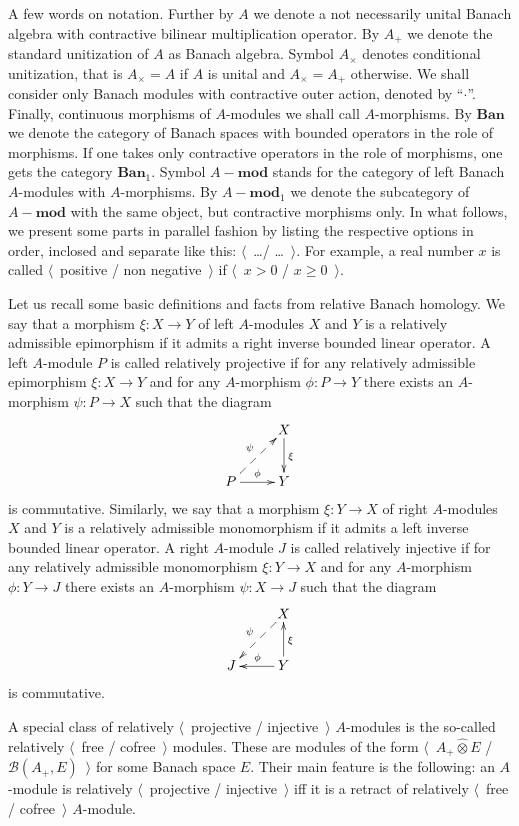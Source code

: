 \documentclass[12pt]{article}
\newcommand{\projtens}{\mathbin{\widehat{\otimes}}}
\begin{document}
A few words on notation. Further by $A$ we denote a not necessarily unital
Banach algebra with contractive bilinear multiplication operator. By $A_+$ we
denote the standard unitization of $A$ as Banach algebra. Symbol $A_\times$
denotes conditional unitization, that is $A_\times=A$ if $A$ is unital and
$A_\times=A_+$ otherwise. We shall consider only Banach modules with contractive
outer action, denoted by ``$\cdot$''. Finally, continuous morphisms of
$A$-modules we shall call $A$-morphisms. By $\mathbf{Ban}$ we denote the
category of Banach spaces with bounded operators in the role of morphisms. If
one takes only contractive operators in the role of morphisms, one gets the
category $\mathbf{Ban}_1$. Symbol $A-\mathbf{mod}$ stands for the 
category of left Banach $A$-modules with $A$-morphisms. 
By $A-\mathbf{mod}_1$ we denote the subcategory of $A-\mathbf{mod}$ 
with the same object, but contractive morphisms only. 
In what follows, we present some parts in parallel fashion by listing the 
respective options in order, inclosed and separate like this: $\langle$~\ldots /
\ldots~$\rangle$. For example, a real number $x$ is called $\langle$~positive /
non negative~$\rangle$ if $\langle$~$x>0$ / $x\geq 0$~$\rangle$.

Let us recall some basic definitions and facts from relative Banach homology. We
say that a morphism $\xi:X\to Y$ of left $A$-modules $X$ and $Y$ is a relatively
admissible epimorphism if it admits a right inverse bounded linear operator. A
left $A$-module $P$ is called relatively projective if for any relatively
admissible  epimorphism $\xi:X\to Y$ and for any $A$-morphism $\phi:P\to Y$
there exists an $A$-morphism $\psi:P\to X$ such that the diagram
$$
    \xymatrix{
    & {X} \ar[d]^{\xi}\\  %
    {P} \ar@{-->}[ur]^{\psi} \ar[r]^{\phi} &{Y}}  %
$$
is commutative. Similarly,  we say that a morphism $\xi:Y\to X$ of right
$A$-modules $X$ and $Y$ is a relatively admissible monomorphism if it admits a
left inverse bounded linear operator. A right $A$-module $J$ is called
relatively injective if for any relatively admissible  monomorphism $\xi:Y\to X$
and for any $A$-morphism $\phi:Y\to J$ there exists an $A$-morphism $\psi:X\to
    J$ such that the diagram
$$
    \xymatrix{
    & {X} \ar@{-->}[dl]_{\psi} \\  %
    {J} &{Y} \ar[l]_{\phi} \ar[u]_{\xi}}  %
$$
is commutative.

A special class of relatively $\langle$~projective / injective~$\rangle$
$A$-modules is the so-called relatively $\langle$~free / cofree~$\rangle$
modules. These are modules of the form $\langle$~$A_+\projtens E$ /
$\mathcal{B}(A_+,E)$~$\rangle$ for some Banach space $E$. Their main feature is
the following: an $A$-module is relatively $\langle$~projective /
injective~$\rangle$ iff it is a retract of relatively $\langle$~free /
cofree~$\rangle$ $A$-module.
\end{document}
